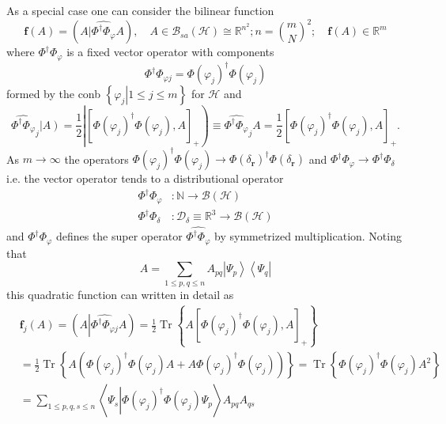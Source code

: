 \documentclass[aps,preprint]{revtex4}%
\begin{document}
As a special case one can consider the bilinear function
\begin{equation}
\boldsymbol{f}\left(  A\right)  =\left(  \left.  A\right\vert \widehat
{\Phi^{\dagger}\Phi_{\varphi}}A\right)  ,\quad A\in\mathcal{B}_{sa}\left(
\mathcal{H}\right)  \cong\mathbb{R}^{n^{2}};n=\binom{m}{N}^{2};\quad
\boldsymbol{f}\left(  A\right)  \in\mathbb{R}^{m}%
\end{equation}
where $\Phi^{\dagger}\Phi_{\varphi}$ is a fixed vector operator with
components
\begin{equation}
\Phi^{\dagger}\Phi_{\varphi j}=\Phi\left(  \varphi_{j}\right)  ^{\dagger}%
\Phi\left(  \varphi_{j}\right)
\end{equation}
formed by the conb $\left\{  \left.  \varphi_{j}\right\vert 1\leq j\leq
m\right\}  $ for $\mathcal{H}$ and
\begin{equation}
\widehat{\Phi^{\dagger}\Phi_{\varphi}}_{j}\left\vert A\right)  =\frac{1}%
{2}\left\vert \left[  \Phi\left(  \varphi_{j}\right)  ^{\dagger}\Phi\left(
\varphi_{j}\right)  ,A\right]  _{+}\right)  \equiv\widehat{\Phi^{\dagger}%
\Phi_{\varphi}}_{j}A=\frac{1}{2}\left[  \Phi\left(  \varphi_{j}\right)
^{\dagger}\Phi\left(  \varphi_{j}\right)  ,A\right]  _{+}.
\end{equation}
As $m\rightarrow\infty$ the operators $\Phi\left(  \varphi_{j}\right)
^{\dagger}\Phi\left(  \varphi_{j}\right)  \rightarrow\Phi\left(
\delta_{\mathbf{r}}\right)  ^{\dagger}\Phi\left(  \delta_{\mathbf{r}}\right)
$ and $\Phi^{\dagger}\Phi_{\varphi}\rightarrow\Phi^{\dagger}\Phi_{\delta}$
i.e. the vector operator tends to a distributional operator%
\begin{align}
\Phi^{\dagger}\Phi_{\varphi}  &  :\mathbb{N}\rightarrow\mathcal{B}\left(
\mathcal{H}\right) \\
\Phi^{\dagger}\Phi_{\delta}  &  :\mathcal{D}_{\delta}\equiv\mathbb{R}%
^{3}\rightarrow\mathcal{B}\left(  \mathcal{H}\right)
\end{align}
and $\Phi^{\dagger}\Phi_{\varphi}$ defines the super operator $\widehat
{\Phi^{\dagger}\Phi_{\varphi}}$ by symmetrized multiplication. Noting that
\begin{equation}
A=\sum_{1\leq p,q\leq n}A_{pq}\left\vert \Psi_{p}\right\rangle \left\langle
\Psi_{q}\right\vert
\end{equation}
this quadratic function can written in detail as%
\begin{align}
&  \boldsymbol{f}_{j}\left(  A\right)  =\left(  A\left\vert \widehat
{\Phi^{\dagger}\Phi_{\varphi j}}A\right.  \right)  =\frac{1}{2}%
\operatorname{Tr}\left\{  A\left[  \Phi\left(  \varphi_{j}\right)  ^{\dagger
}\Phi\left(  \varphi_{j}\right)  ,A\right]  _{+}\right\} \\
&  =\frac{1}{2}\operatorname{Tr}\left\{  A\left(  \Phi\left(  \varphi
_{j}\right)  ^{\dagger}\Phi\left(  \varphi_{j}\right)  A+A\Phi\left(
\varphi_{j}\right)  ^{\dagger}\Phi\left(  \varphi_{j}\right)  \right)
\right\}  =\operatorname{Tr}\left\{  \Phi\left(  \varphi_{j}\right)
^{\dagger}\Phi\left(  \varphi_{j}\right)  A^{2}\right\} \\
&  =\sum_{1\leq p,q,s\leq n}\left\langle \Psi_{s}\left\vert \Phi\left(
\varphi_{j}\right)  ^{\dagger}\Phi\left(  \varphi_{j}\right)  \Psi_{p}\right.
\right\rangle A_{pq}A_{qs}%
\end{align}
\end{document}
